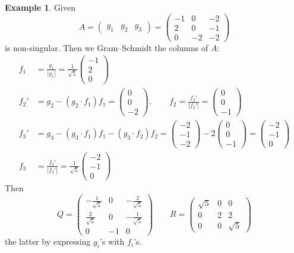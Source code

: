\documentclass[a4paper]{article}
\theoremstyle{definition}
\newtheorem{example}[defn]{Example}
\begin{document}
\begin{example}
Given
\[
A=\begin{pmatrix}
g_1 & g_2 & g_3
\end{pmatrix} = \begin{pmatrix}
-1 & 0 & -2\\ 2 & 0 & -1\\ 0 & -2 & -2
\end{pmatrix}
\]
is non-singular. Then we Gram–Schmidt the columns of $A$:
\[
\begin{aligned}
f_1&=\frac{g_1}{|g_1|} = \frac{1}{\sqrt 5} \begin{pmatrix}
-1 \\ 2 \\ 0
\end{pmatrix} \\
f_2'&= g_2-(g_2\cdot f_1)f_1=\begin{pmatrix}
0 \\ 0 \\ -2
\end{pmatrix},\qquad f_2=\frac{f_2'}{|f_2'|}=\begin{pmatrix}
0 \\ 0 \\ -1
\end{pmatrix} \\
f_3'&=g_3-(g_3\cdot f_1)f_1-(g_3\cdot f_2)f_2= \begin{pmatrix}
-2 \\ -1 \\ -2
\end{pmatrix}-2\begin{pmatrix}
0 \\ 0 \\ -1
\end{pmatrix} = \begin{pmatrix}
-2 \\ -1 \\ 0
\end{pmatrix} \\
f_3&=\frac{f_3'}{|f_3'|} = \frac{1}{\sqrt 5}\begin{pmatrix}
-2 \\ -1 \\ 0
\end{pmatrix}
\end{aligned}
\]
Then
\[
Q=\begin{pmatrix}
-\frac{1}{\sqrt 5} & 0 & -\frac{2}{\sqrt 5} \\ \frac{2}{\sqrt 5} & 0 & -\frac{1}{\sqrt 5} \\ 0 & -1 & 0
\end{pmatrix} \qquad R=\begin{pmatrix}
\sqrt 5 & 0 & 0 \\ 0 & 2 & 2 \\ 0 & 0 & \sqrt 5
\end{pmatrix}
\]
the latter by expressing $g_i$'s with $f_i$'s.
\end{example}
\end{document}
